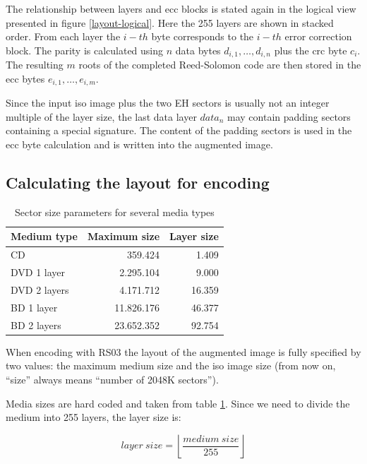 The relationship between layers and ecc blocks is stated again in the
logical view presented in figure \ref{layout-logical}. Here the 255 layers are
shown in stacked order. From each layer the $i-th$ byte corresponds to the
$i-th$ error correction block. The parity is calculated using $n$ data bytes
$d_{i,1},\ldots,d_{i,n}$ plus the crc byte $c_i$. The resulting $m$ roots of 
the completed Reed-Solomon code are then stored in the 
ecc bytes $e_{i,1},\ldots, e_{i,m}$. 

Since the input iso image plus the two EH sectors is usually not an integer 
multiple of the layer size, the last data layer $data_n$ may contain padding
sectors containing a special signature. The content of the padding sectors
is used in the ecc byte calculation and is written into the augmented image.

\subsection{Calculating the layout for encoding}

\begin{table}
 \begin{center}
 \begin{tabular}{|lrr|}
 \hline
 Medium type &  Maximum size & Layer size \\
 \hline
 CD & 359.424 & 1.409 \\
 DVD 1 layer & 2.295.104 & 9.000 \\
 DVD 2 layers & 4.171.712 & 16.359 \\
 BD 1 layer & 11.826.176 & 46.377 \\
 BD 2 layers & 23.652.352 & 92.754 \\
 \hline
 \end{tabular}
 \caption{Sector size parameters for several media types}
 \label{layout-size-table}
 \end{center}
\end{table}

When encoding with RS03 the layout of the augmented image is fully specified
by two values: the maximum medium size and the iso image size
(from now on, ``size'' always means ``number of 2048K sectors''). \bigskip

Media sizes are hard coded and taken from table \ref{layout-size-table}. Since we need to divide the medium into 255 layers, the layer size
is:
 
\[layer\ size = \left\lfloor\frac{medium\ size}{255}\right\rfloor\]

